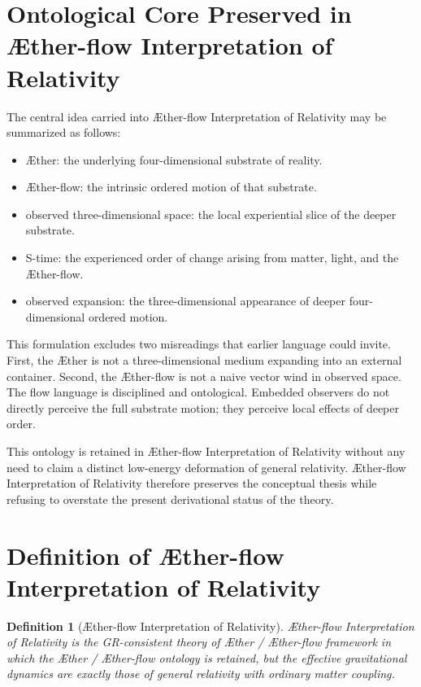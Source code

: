 \documentclass[11pt]{article}
\newcommand{\Aether}{\AE{}ther}
\newcommand{\Aflow}{\AE{}ther-flow}
\newcommand{\TheoryName}{\Aflow{} Interpretation of Relativity}
\newcommand{\TheoryProgram}{\Aether{} / \Aflow{} framework}
\newtheorem{definition}{Definition}
\begin{document}
\section{Ontological Core Preserved in \TheoryName{}}

The central idea carried into \TheoryName{} may be summarized as follows:
\begin{itemize}
    \item \Aether{}: the underlying four-dimensional substrate of reality.
    \item \Aflow{}: the intrinsic ordered motion of that substrate.
    \item observed three-dimensional space: the local experiential slice of the deeper substrate.
    \item S-time: the experienced order of change arising from matter, light, and the \Aflow{}.
    \item observed expansion: the three-dimensional appearance of deeper four-dimensional ordered motion.
\end{itemize}

This formulation excludes two misreadings that earlier language could invite. First, the \Aether{} is not a three-dimensional medium expanding into an external container. Second, the \Aflow{} is not a naive vector wind in observed space. The flow language is disciplined and ontological. Embedded observers do not directly perceive the full substrate motion; they perceive local effects of deeper order.

This ontology is retained in \TheoryName{} without any need to claim a distinct low-energy deformation of general relativity. \TheoryName{} therefore preserves the conceptual thesis while refusing to overstate the present derivational status of the theory.

\section{Definition of \TheoryName{}}

\begin{definition}[\TheoryName{}]
\TheoryName{} is the GR-consistent theory of \TheoryProgram{} in which the \Aether{} / \Aflow{} ontology is retained, but the effective gravitational dynamics are exactly those of general relativity with ordinary matter coupling.
\end{definition}
\end{document}
